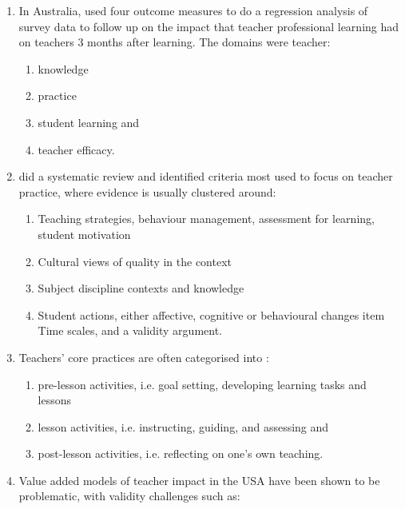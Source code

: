     \begin{enumerate}
        \item In Australia, \textcite{ingvarsonRecognisingAccomplishedTeachers2010} used four outcome measures to do a regression analysis of survey data to follow up on the impact that teacher professional learning had on teachers 3 months after learning. The domains were teacher:
        \begin{enumerate}
            \item knowledge
            \item practice
            \item student learning and
            \item teacher efficacy.
        \end{enumerate}
        \item \textcite{bellQualitiesClassroomObservation2019} did a systematic review and identified criteria most used to focus on teacher practice, where evidence is usually clustered around:
        \begin{enumerate}
            \item Teaching strategies, behaviour management, assessment for learning, student motivation
            \item Cultural views of quality in the context
            \item Subject discipline contexts and knowledge
            \item Student actions, either affective, cognitive or behavioural changes
            item Time scales, and a validity argument.
        \end{enumerate}
        \item Teachers’ core practices are often categorised into  \parencite{vanderschaafEvidenceMeasuringTeachers2019}:
        \begin{enumerate}
            \item pre-lesson activities, i.e. goal setting, developing learning tasks and lessons
            \item lesson activities, i.e. instructing, guiding, and assessing and
            \item post-lesson activities, i.e. reflecting on one’s own teaching.
        \end{enumerate}
        \item Value added models of teacher impact in the USA have been shown to be problematic, with validity challenges such as:
        \begin{enumerate}

\end{enumerate}
\end{enumerate}
